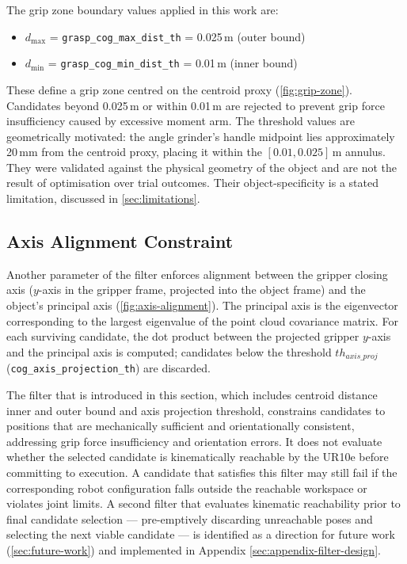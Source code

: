 \documentclass[oneside,studentpaper]{wbk}
\newcommand{\param}[1]{\texttt{#1}}
\begin{document}
The grip zone boundary values applied in this work are:
\begin{itemize}
  \item $d_{\max}$ = \param{grasp\_cog\_max\_dist\_th} = 0.025\,m (outer bound)
  \item $d_{\min}$ = \param{grasp\_cog\_min\_dist\_th} = 0.01\,m (inner bound)
\end{itemize}

These define a grip zone centred on the centroid proxy (\cref{fig:grip-zone}). Candidates beyond 0.025\,m or within 0.01\,m are rejected to prevent grip force insufficiency caused by excessive moment arm. The threshold values are geometrically motivated: the angle grinder's handle midpoint lies approximately 20\,mm from the centroid proxy, placing it within the $[0.01, 0.025]$\,m annulus. They were validated against the physical geometry of the object and are not the result of optimisation over trial outcomes. Their object-specificity is a stated limitation, discussed in \cref{sec:limitations}.

\subsection{Axis Alignment Constraint}
\label{sec:axis-alignment-constraint}

Another parameter of the filter enforces alignment between the gripper closing axis ($y$-axis in the gripper frame, projected into the object frame) and the object's principal axis (\cref{fig:axis-alignment}). The principal axis is the eigenvector corresponding to the largest eigenvalue of the point cloud covariance matrix. For each surviving candidate, the dot product between the projected gripper $y$-axis and the principal axis is computed; candidates below the threshold $th_{axis\_proj}$ (\param{cog\_axis\_projection\_th}) are discarded.


The filter that is introduced in this section, which includes centroid distance inner and outer bound and axis projection threshold, constrains candidates to positions that are mechanically sufficient and orientationally consistent, addressing grip force insufficiency and orientation errors. It does not evaluate whether the selected candidate is kinematically reachable by the UR10e before committing to execution. A candidate that satisfies this filter may still fail if the corresponding robot configuration falls outside the reachable workspace or violates joint limits. A second filter that evaluates kinematic reachability prior to final candidate selection --- pre-emptively discarding unreachable poses and selecting the next viable candidate --- is identified as a direction for future work (\cref{sec:future-work}) and implemented in Appendix \cref{sec:appendix-filter-design}.
\end{document}
